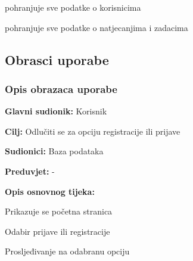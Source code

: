 \begin{packed_enum}
\begin{packed_enum}
				\end{packed_enum}

				\item  {}
				
				\begin{packed_enum}
					
					\item pohranjuje sve podatke o korisnicima
					\item pohranjuje sve podatke o natjecanjima i zadacima
					
				\end{packed_enum}
			\end{packed_enum}

			\eject 
			
			
				
			\subsection{Obrasci uporabe}
				
				
				\subsubsection{Opis obrazaca uporabe}
					

					\noindent {}
					\begin{packed_item}
	
						\item \textbf{Glavni sudionik: }Korisnik
						\item  \textbf{Cilj:} Odlučiti se za opciju registracije ili prijave
						\item  \textbf{Sudionici:} Baza podataka
						\item  \textbf{Preduvjet:} -
						\item  \textbf{Opis osnovnog tijeka:}
						
						\item[] \begin{packed_enum}
	
							\item Prikazuje se početna stranica
							\item Odabir prijave ili registracije
							\item Prosljeđivanje na odabranu opciju
							
						\end{packed_enum}
					\end{packed_item}
					
